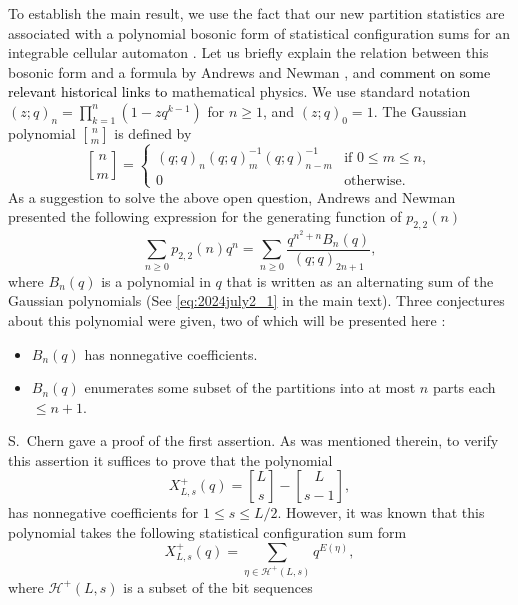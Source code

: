 \documentclass[sn-mathphys-num]{sn-jnl}%
\newcommand{\red}[1]{\textcolor{black}{#1}}
\theoremstyle{thmstyleone}%
\theoremstyle{thmstyletwo}%
\theoremstyle{thmstylethree}%
\begin{document}
To establish the main result, we use the fact that
our new partition statistics are associated with
a polynomial bosonic form of statistical configuration sums
for an integrable cellular automaton \cite{KOTY, Takagi1}.
Let us briefly explain the relation between this bosonic form and
a formula by Andrews and Newman \cite{AN2020}, and 
\red{comment on some relevant historical links to} mathematical physics.
We use standard notation
$(z;q)_n = \prod_{k=1}^n (1-z q^{k-1})$ for $n\geq1$, and 
$(z;q)_0=1$.
The Gaussian polynomial ${n \brack m}$ is defined by
\begin{equation}\label{eq:gaussianpoly}
{n \brack m} =
\begin{cases}
(q;q)_n (q;q)_m^{-1}(q;q)_{n-m}^{-1} & \mbox{if } 0 \leq m \leq n, \\
0 & \mbox{otherwise}.
\end{cases}
\end{equation}
%
As a suggestion to solve the above open question, Andrews and Newman presented
the following expression for the generating function of $p_{2,2}(n)$
\begin{equation*}
\sum_{n \geq 0} p_{2,2}(n) q^n 
=  \sum_{n \geq 0} \frac{q^{n^2+n} B_n(q)}{(q;q)_{2n+1}},
\end{equation*}
where $B_n(q)$ is a polynomial in $q$ that is 
written as an alternating sum of the Gaussian polynomials 
(See \eqref{eq:2024july2_1} in the main text).
Three conjectures about this polynomial were given, {two of which will be presented here} \cite[p.~9, Questions II (1) and II (3)]{AN2020}:
\begin{itemize}
\item $B_n(q)$ has nonnegative coefficients.
\item $B_n(q)$ enumerates some subset of the partitions into at most $n$ parts each $\leq n+1$. 
\end{itemize}
S.~Chern \cite{Chern} gave a proof of the first assertion.
As was mentioned therein, to verify this assertion it suffices to prove that the polynomial
\begin{equation*} 
X^+_{L,s}(q)  = { L \brack s }- { L \brack s-1},
\end{equation*}
has nonnegative coefficients for $1 \leq s \leq L/2$.
However, it was known that this polynomial takes the following 
statistical configuration {sum form}
\begin{equation*} 
X^+_{L,s}(q) =
\sum_{\eta \in \mathcal{H}^{+} (L,s)} q^{E(\eta)},
\end{equation*}
where $\mathcal{H}^{+} (L,s)$ is a subset of the bit sequences
\end{document}
